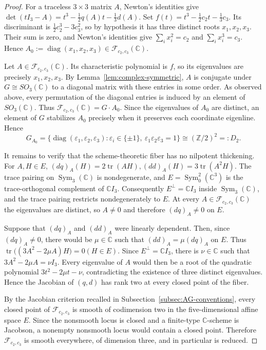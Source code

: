 \documentclass[12pt,leqno]{amsart}
\numberwithin{equation}{section} \newtheorem{thm}{Theorem}[section] \newtheorem{lem}[thm]{Lemma} \newtheorem{ex}[thm]{Example} \newtheorem{prop}[thm]{Proposition} \newtheorem{cor}[thm]{Corollary} \newtheorem{defi}[thm]{Definition} \newtheorem{rmk}[thm]{Remark} \newtheorem{notation}[thm]{Notation}
\newcommand{\Sym}{\operatorname{Sym}}
\def\Z{\mathbb{Z}} \def\N{\mathbb{N}} \def\A{\mathbb{A}} \def\C{\mathbb{C}} \def\R{\mathbb{R}} \def\Q{\mathbb{Q}} \def\F{\mathbb{F}}
\begin{document}
\begin{proof}
For a traceless $3\times3$ matrix $A$, Newton's identities give \(\det(tI_3-A) =t^3-\frac12q(A)t-\frac13d(A)\). Set \(f(t)=t^3-\frac12c_2t-\frac13c_3.\) Its discriminant is \(\frac12c_2^3-3c_3^2\), so by hypothesis it has three distinct roots $x_1,x_2,x_3$. Their sum is zero, and Newton's identities give \(\sum_i x_i^2=c_2\) and \(\sum_i x_i^3=c_3\). Hence \(A_0:=\operatorname{diag}(x_1,x_2,x_3)\in \mathcal F_{c_2,c_3}(\C).\)

Let $A\in\mathcal F_{c_2,c_3}(\C)$. Its characteristic polynomial is $f$, so its eigenvalues are precisely $x_1,x_2,x_3$. By Lemma~\ref{lem:complex-symmetric}, $A$ is conjugate under $G\cong SO_3(\C)$ to a diagonal matrix with these entries in some order. As observed above, every permutation of the diagonal entries is induced by an element of $SO_3(\C)$. Thus \(\mathcal F_{c_2,c_3}(\C)=G\cdot A_0.\) Since the eigenvalues of $A_0$ are distinct, an element of $G$ stabilizes $A_0$ precisely when it preserves each coordinate eigenline. Hence
\[
G_{A_0}
 =\{\operatorname{diag}(\varepsilon_1,\varepsilon_2,\varepsilon_3):
   \varepsilon_i\in\{\pm1\},\
   \varepsilon_1\varepsilon_2\varepsilon_3=1\}
 \cong(\Z/2)^2=:D_2.
\]

It remains to verify that the scheme-theoretic fiber has no nilpotent thickening. For $A,H\in E$, \((dq)_A(H)=2\operatorname{tr}(AH), (dd)_A(H)=3\operatorname{tr}(A^2H).\) The trace pairing on $\Sym_3(\C)$ is nondegenerate, and $E=\Sym^2_0(\C^3)$ is the trace-orthogonal complement of $\C I_3$. Consequently \(E^\perp=\C I_3\) inside $\Sym_3(\C)$, and the trace pairing restricts nondegenerately to $E$. At every $A\in\mathcal F_{c_2,c_3}(\C)$ the eigenvalues are distinct, so $A\ne0$ and therefore $(dq)_A\ne0$ on $E$.

Suppose that $(dq)_A$ and $(dd)_A$ were linearly dependent. Then, since $(dq)_A\ne0$, there would be $\mu\in\C$ such that $(dd)_A=\mu(dq)_A$ on $E$. Thus \(\operatorname{tr}\bigl((3A^2-2\mu A)H\bigr)=0 (H\in E).\) Since $E^\perp=\C I_3$, there is $\nu\in\C$ such that \(3A^2-2\mu A=\nu I_3.\) Every eigenvalue of $A$ would then be a root of the quadratic polynomial \(3t^2-2\mu t-\nu\), contradicting the existence of three distinct eigenvalues. Hence the Jacobian of $(q,d)$ has rank two at every closed point of the fiber.

By the Jacobian criterion recalled in Subsection~\ref{subsec:AG-conventions}, every closed point of $\mathcal F_{c_2,c_3}$ is smooth of codimension two in the five-dimensional affine space $E$. Since the nonsmooth locus is closed and a finite-type $\C$-scheme is Jacobson, a nonempty nonsmooth locus would contain a closed point. Therefore $\mathcal F_{c_2,c_3}$ is smooth everywhere, of dimension three, and in particular is reduced.


\end{proof}
\end{document}
